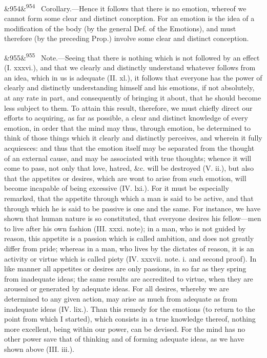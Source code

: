 \documentclass[12pt]{article}
\newcommand{\para}[1][]{\par\noindent\ifx&#1&\else\textsuperscript{\footnotesize #1}~\fi}
\begin{document}
\para[954] Corollary.---Hence it follows that there is no emotion, whereof we cannot form some clear and distinct conception. For an emotion is the idea of a modification of the body (by the general Def. of the Emotions), and must therefore (by the preceding Prop.) involve some clear and distinct conception.

\para[955] Note.---Seeing that there is nothing which is not followed by an effect (I. xxxvi.), and that we clearly and distinctly understand whatever follows from an idea, which in us is adequate (II. xl.), it follows that everyone has the power of clearly and distinctly understanding himself and his emotions, if not absolutely, at any rate in part, and consequently of bringing it about, that he should become less subject to them. To attain this result, therefore, we must chiefly direct our efforts to acquiring, as far as possible, a clear and distinct knowledge of every emotion, in order that the mind may thus, through emotion, be determined to think of those things which it clearly and distinctly perceives, and wherein it fully acquiesces: and thus that the emotion itself may be separated from the thought of an external cause, and may be associated with true thoughts; whence it will come to pass, not only that love, hatred, \&c. will be destroyed (V. ii.), but also that the appetites or desires, which are wont to arise from such emotion, will become incapable of being excessive (IV. lxi.). For it must be especially remarked, that the appetite through which a man is said to be active, and that through which he is said to be passive is one and the same. For instance, we have shown that human nature is so constituted, that everyone desires his fellow---men to live after his own fashion (III. xxxi. note); in a man, who is not guided by reason, this appetite is a passion which is called ambition, and does not greatly differ from pride; whereas in a man, who lives by the dictates of reason, it is an activity or virtue which is called piety (IV. xxxvii. note. i. and second proof). In like manner all appetites or desires are only passions, in so far as they spring from inadequate ideas; the same results are accredited to virtue, when they are aroused or generated by adequate ideas. For all desires, whereby we are determined to any given action, may arise as much from adequate as from inadequate ideas (IV. lix.). Than this remedy for the emotions (to return to the point from which I started), which consists in a true knowledge thereof, nothing more excellent, being within our power, can be devised. For the mind has no other power save that of thinking and of forming adequate ideas, as we have shown above (III. iii.).
\end{document}
